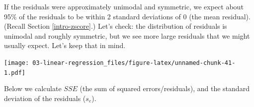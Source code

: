 \documentclass[
]{book}
\newenvironment{Shaded}{\begin{snugshade}}{\end{snugshade}}
\newcommand{\CommentTok}[1]{\textcolor[rgb]{0.56,0.35,0.01}{\textit{#1}}}
\newcommand{\DataTypeTok}[1]{\textcolor[rgb]{0.13,0.29,0.53}{#1}}
\newcommand{\DecValTok}[1]{\textcolor[rgb]{0.00,0.00,0.81}{#1}}
\newcommand{\KeywordTok}[1]{\textcolor[rgb]{0.13,0.29,0.53}{\textbf{#1}}}
\newcommand{\NormalTok}[1]{#1}
\newcommand{\OperatorTok}[1]{\textcolor[rgb]{0.81,0.36,0.00}{\textbf{#1}}}
\newcommand{\StringTok}[1]{\textcolor[rgb]{0.31,0.60,0.02}{#1}}
\begin{document}
If the residuals were approximately unimodal and symmetric, we expect about 95\% of the residuals to be within 2 standard deviations of 0 (the mean residual). (Recall Section \ref{intro-zscore}.) Let's check: the distribution of residuals is unimodal and roughly symmetric, but we see more large residuals that we might usually expect. Let's keep that in mind.

\begin{Shaded}
\end{Shaded}

\texttt{[image: 03-linear-regression\_files/figure-latex/unnamed-chunk-41-1.pdf]}

Below we calculate \(SSE\) (the sum of squared errors/residuals), and the standard deviation of the residuals (\(s_e\)).

\begin{Shaded}
\end{Shaded}
\end{document}
